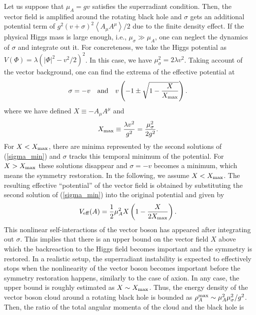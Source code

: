 \documentclass[%
 preprint,
 nofootinbib,
 amsmath,amssymb,
 aps,
 a4paper
]{revtex4-1}
\begin{document}
Let us suppose that $\mu_A=gv$ satisfies the superradiant condition. Then, the vector field is amplified around the rotating black hole and $\sigma$ gets an additional potential term of $g^2(v+\sigma)^2\left<A_\mu A^\mu\right>/2$ due to the finite density effect.
If the physical Higgs mass is large enough, i.e., $\mu_\sigma \gg \mu_A$, one can neglect the dynamics of $\sigma$ and integrate out it. For concreteness, we take the Higgs potential as $V(\Phi)=\lambda (|\Phi|^2-v^2/2)^2$. In this case, we have $\mu_\sigma^2=2\lambda v^2$.
Taking account of the vector background, one can find the extrema of the effective potential at
\begin{align}
	\sigma = -v~~~{\rm and}~~~v\left(-1\pm \sqrt{1-\frac{X}{X_{\rm max}}} \right).  \label{sigma_min}
\end{align}
where we have defined $X\equiv -A_\mu A^\mu$ and
\begin{align}
    X_{\rm max} \equiv \frac{\lambda v^2}{g^2} = \frac{\mu_\sigma^2}{2g^2}.
\end{align}
For $X < X_{\rm max}$, there are minima represented by the second solutions of (\ref{sigma_min}) and $\sigma$ tracks this temporal minimum of the potential. For $X>X_{\rm max}$ these solutions disappear and $\sigma=-v$ becomes a minimum, which means the symmetry restoration.
In the following, we assume $X < X_{\rm max}$.
The resulting effective ``potential'' of the vector field is obtained by substituting the second solution of (\ref{sigma_min}) into the original potential and given by
\begin{align}
	V_{\rm eff}(A) = \frac{1}{2}\mu_A^2 X \left(1-\frac{X}{2X_{\rm max}} \right).  \label{VeffA}
\end{align}
This nonlinear self-interactions of the vector boson has appeared after integrating out $\sigma$.
This implies that there is an upper bound on the vector field $X$ above which the backreaction to the Higgs field becomes important and the symmetry is restored. In a realistic setup, the superradiant instability is expected to effectively stops when the nonlinearity of the vector boson becomes important before the symmetry restoration happens, similarly to the case of axion. In any case, the upper bound is roughly estimated as $X \sim X_{\rm max}$.
Thus, the energy density of the vector boson cloud around a rotating black hole is bounded as $\rho_A^{\rm max} \sim \mu_A^2 \mu_\sigma^2/g^2$. Then, the ratio of the total angular momenta of the cloud and the black hole is
\end{document}
